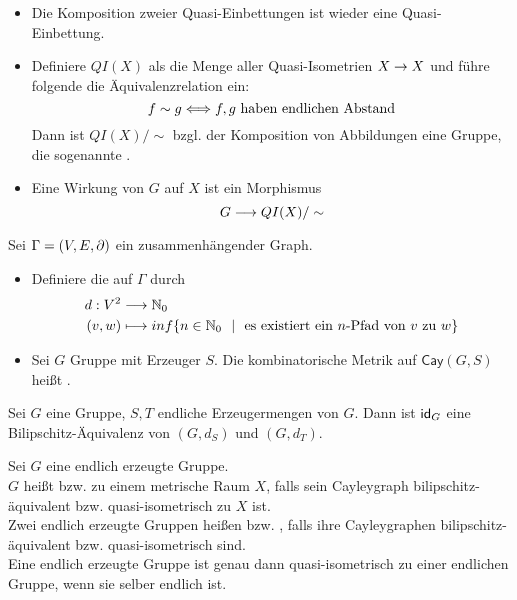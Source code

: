 \documentclass{article}
\newcommand{\Cay}[2]{\textsf{Cay}(#1,#2)}
\begin{document}
\begin{itemize}
\item Die Komposition zweier Quasi-Einbettungen ist wieder eine Quasi-Einbettung.
\item Definiere $QI(X)$ als die Menge aller Quasi-Isometrien $X\overset{}{\rightarrow} X$ und führe folgende die Äquivalenzrelation ein:
\[ f\sim g \overset{}{\Longleftrightarrow} f,g \text{ haben endlichen Abstand} \]
Dann ist $QI(X)/\sim$ bzgl. der Komposition von Abbildungen eine Gruppe, die sogenannte .
\item Eine Wirkung von $G$ auf $X$  ist ein Morphismus
\[G \overset{}{\longrightarrow} QI(X)/\sim \]
\end{itemize}


\Def{}
Sei $\Gamma = (V,E, \partial)$ ein zusammenhängender Graph.
\begin{itemize}
\item Definiere die  auf $\Gamma$ durch
\begin{align*}
d : V^2 &\overset{}{\longrightarrow} \mathbb{N}_0\\
(v,w) & \longmapsto inf \{n \in \mathbb{N}_0 ~~|~~\text{es existiert ein }n \text{-Pfad von }v \text{ zu }w \}
\end{align*}
\item Sei $G$ Gruppe mit Erzeuger $S$. Die kombinatorische Metrik auf $\Cay{G}{S}$ heißt .
\end{itemize}


Sei $G$ eine Gruppe, $S,T$ endliche Erzeugermengen von $G$.
Dann ist $\textsf{id}_{G}$ eine Bilipschitz-Äquivalenz von $(G,d_S)$ und $(G,d_T)$.

Sei $G$ eine endlich erzeugte Gruppe.\\
$G$ heißt  bzw.  zu einem metrische Raum $X$, falls sein Cayleygraph {bilipschitz-äquivalent} bzw. {quasi-isometrisch} zu $X$ ist.\\
Zwei endlich erzeugte Gruppen heißen  bzw. , falls ihre Cayleygraphen {bilipschitz-äquivalent} bzw. {quasi-isometrisch} sind.\\

\Kor{}
Eine endlich erzeugte Gruppe ist genau dann quasi-isometrisch zu einer endlichen Gruppe, wenn sie selber endlich ist.
\end{document}
